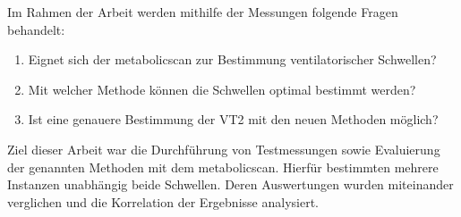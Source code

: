 Im Rahmen der Arbeit werden mithilfe der Messungen folgende Fragen behandelt:
%
\begin{enumerate}
	\item Eignet sich der metabolicscan zur Bestimmung ventilatorischer Schwellen?
	\item Mit welcher Methode können die Schwellen optimal bestimmt werden?
	\item Ist eine genauere Bestimmung der VT2 mit den neuen Methoden möglich?
\end{enumerate}
%
Ziel dieser Arbeit war die Durchführung von Testmessungen sowie Evaluierung der genannten Methoden mit dem metabolicscan. Hierfür bestimmten mehrere Instanzen unabhängig beide Schwellen. Deren Auswertungen wurden miteinander verglichen und die Korrelation der Ergebnisse analysiert.
\clearpage